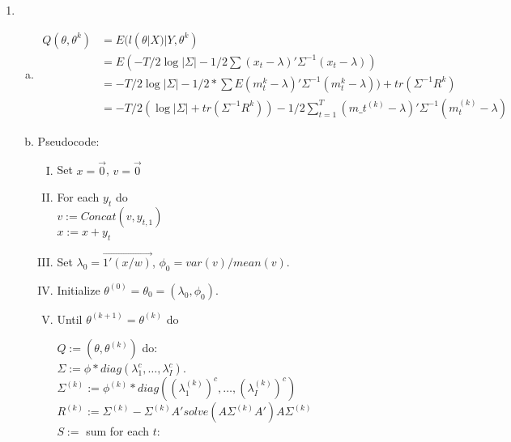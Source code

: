 \documentclass[paper=a4, fontsize=11pt]{scrartcl}
\begin{document}
\begin{enumerate}
\begin{enumerate}[1]
      \item
        \begin{enumerate}[a.]
          \item
          \begin{align*}
            Q(\theta, \theta^k) &= E(l(\theta|X)|Y, \theta^k) \\
            &= E(-T/2\log{|\Sigma|} - 1/2\sum{(x_t-\lambda)'\Sigma^{-1}(x_t - \lambda)}) \\
            &= -T/2\log{|\Sigma|} - 1/2*\sum{E(m_t^k - \lambda)'\Sigma^{-1}(m_t^k - \lambda)) + tr(\Sigma^{-1}R^{k})} \\
            &= -T/2(\log{|\Sigma|} + tr(\Sigma^{-1}R^k)) - 1/2\sum_{t=1}^{T}{(m\_t^{(k)} - \lambda)'\Sigma^{-1}(m_t^{(k)} - \lambda)}
          \end{align*}
          \item Pseudocode:
            \begin{enumerate}[I.]
              \item Set $x = \vec{0}$, $v = \vec{0}$
              \item For each $y_t$ do \\
                \indent $v := Concat(v, y_{t,1})$ \\
                \indent $x := x + y_t$
              \item Set $\lambda_0 = \overrightarrow{1'(x/w)}$, $\phi_0 = var(v)/mean(v)$.
              \item Initialize $\theta^{(0)} = \theta_0 = (\lambda_0, \phi_0)$.
              \item Until $\theta^{(k+1)} = \theta^{(k)}$ do \\
                \begin{tabbing}
                  \hspace{1cm} $Q := (\theta, \theta^{(k)})$ do: \\
                  \hspace{2cm} $\Sigma := \phi*diag(\lambda_1^c, \ldots, \lambda_I^c)$. \\
                  \hspace{2cm} $\Sigma^{(k)} := \phi^{(k)}*diag((\lambda_1^{(k)})^c, \ldots, (\lambda_I^{(k)})^c)$ \\
                  \hspace{2cm} $R^{(k)} := \Sigma^{(k)} - \Sigma^{(k)}A'solve(A\Sigma^{(k)}A')A\Sigma^{(k)}$ \\
                  \hspace{2cm} $S := $ sum for each $t$: \\

\end{tabbing}
\end{enumerate}
\end{enumerate}
\end{enumerate}
\end{enumerate}
\end{document}
